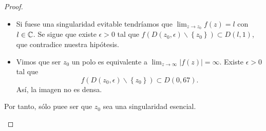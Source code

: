 \begin{proof}
\begin{description}
\begin{itemize}
		\item Si fuese una singularidad evitable tendríamos que $\displaystyle \lim_{z \to z_{0}}f\left(z\right) = l$ con $\displaystyle l \in \mathbb{C} $. Se sigue que existe $\displaystyle \epsilon > 0 $ tal que $\displaystyle f\left(D\left(z_{0}, \epsilon \right)\backslash \left\{ z_{0}\right\} \right)\subset D\left(l, 1\right) $, que contradice nuestra hipótesis.
		\item Vimos que ser $\displaystyle z_{0} $ un polo es equivalente a $\displaystyle \lim_{z \to \infty} \left|f\left(z\right)\right|=\infty  $. Existe $\displaystyle \epsilon > 0 $ tal que 
			\[f\left(D\left(z_{0}, \epsilon \right)\backslash \left\{ z_{0}\right\} \right)\subset D\left(0,67\right) .\]
			Así, la imagen no es densa.
	\end{itemize}
Por tanto, sólo puee ser que $\displaystyle z_{0} $ sea una singularidad esencial.	
\end{description}
\end{proof}

